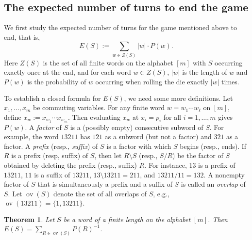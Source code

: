 \documentclass[10pt]{amsart}
\newtheorem{theorem}{Theorem}[section]
\theoremstyle{definition}
\theoremstyle{remark}
\DeclareMathOperator{\overlap}{ov}
\begin{document}
\subsection{The expected number of turns to end the game}
We first study the expected number of turns for the game mentioned above to end, that is,
\[ 
E(S) := \sum_{w\in Z(S)} |w|\cdot P(w).
\] 
Here $Z(S)$ is the set of all finite words on the alphabet $[m]$ with $S$ occurring exactly once at the end, and for each word $w\in Z(S)$, $|w|$ is the length of $w$ and $P(w)$ is the probability of $w$ occurring when rolling the die exactly $|w|$ times.

To establish a closed formula for $E(S)$, we need some more definitions.
Let $x_1, \ldots, x_m$ be commuting variables.
For any finite word $w=w_1\cdots w_\ell$ on $[m]$, define $x_w:=x_{w_1}\cdots x_{w_m}$.
Then evaluating $x_w$ at $x_i=p_i$ for all $i=1,\ldots, m$ gives $P(w)$.
A \emph{factor} of $S$ is a (possibly empty) consecutive subword of $S$.
For example, the word $13211$ has $121$ as a subword (but not a factor) and $321$ as a factor.
A \emph{prefix} (resp., \emph{suffix}) of $S$ is a factor with which $S$ begins (resp., ends).
If $R$ is a prefix (resp, suffix) of $S$, then let $R\setminus S$ (resp., $S/R$) be the factor of $S$ obtained by deleting the prefix (resp., suffix) $R$.
For instance, $13$ is a prefix of $13211$, $11$ is a suffix of $13211$, $13\setminus 13211 = 211$, and $13211/11=132$.
A nonempty factor of $S$ that is simultaneously a prefix and a suffix of $S$ is called an \emph{overlap} of $S$.
Let $\overlap(S)$ denote the set of all overlaps of $S$, e.g., $\overlap(13211) = \{1, 13211\}$.


\begin{theorem}\label{thm:die}
Let $S$ be a word of a finite length on the alphabet $[m]$.
Then $E(S) = \sum_{R\in\overlap(S)} P(R)^{-1}$.
\end{theorem}
\end{document}
